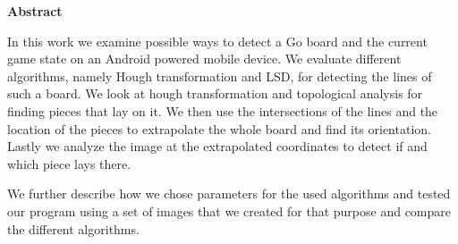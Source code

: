 \documentclass[english,bt]{package/lmedoc}
\begin{document}
\begin{center}
\bfseries
Abstract
\normalfont

In this work we examine possible ways to detect a Go board and the current game state on an Android powered mobile device. We evaluate different algorithms, namely Hough transformation and LSD, for detecting the lines of such a board.  We look at hough transformation and topological analysis for finding pieces that lay on it. We then use the intersections of the lines and the location of the pieces to extrapolate the whole board and find its orientation. Lastly we analyze the image at the extrapolated coordinates to detect if and which piece lays there.

We further describe how we chose parameters for the used algorithms and tested our program using a set of images that we created for that purpose and compare the different algorithms.
\end{center}

\cleardoublepage

\tableofcontents

\cleardoublepage {}


\cleardoublepage

\cleardoublepage

\cleardoublepage

\cleardoublepage

\cleardoublepage

\appendix
\cleardoublepage

\cleardoublepage
\cleardoublepage
\end{document}
